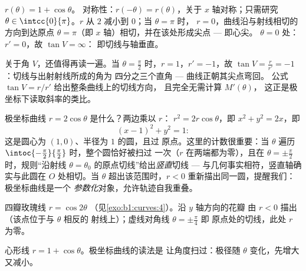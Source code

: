 \begin{example}[心形线]\label{ex:b1:curves:cardioid}
$r(\theta) = 1 + \cos\theta$。 对称性：$r(-\theta)
= r(\theta)$，关于 $x$ 轴对称；只需研究 $\theta \in
\intcc{0}{\pi}$。$r$ 从 $2$ 减小到 $0$；当 $\theta = \pi$ 时，
$r = 0$，曲线沿与射线相切的方向到达原点
$\theta = \pi$（即 $x$ 轴）相切，并在该处形成尖点 --- 即心尖。
$\theta = 0$ 处：$r' = 0$，故 $\tan V = \infty$：
即切线与轴垂直。

关于角 $V$，还值得再读一遍。当 $\theta =
\frac\pi2$ 时，$r = 1$，$r' = -1$，故 $\tan V = \frac{r}{r'} =
-1$：切线与出射射线所成的角为
四分之三个直角 --- 曲线正朝其尖点弯回。
公式 $\tan V = r/r'$ 给出整条曲线上的切线方向，
且完全无需计算 $M'(\theta)$，
这正是极坐标下读取斜率的类比。
\end{example}

\begin{example}
\label{ex:b1:curves:polarcircle}
极坐标曲线 $r = 2\cos\theta$ 是什么？两边乘以 $r$：
$r^2 = 2r\cos\theta$，即 $x^2 + y^2 = 2x$，即
\[
(x - 1)^2 + y^2 = 1 :
\]
这是圆心为 $(1, 0)$、半径为 $1$ 的圆，且过
原点。这里的计数很重要：当 $\theta$ 遍历
$\intoc{-\frac\pi2}{\frac\pi2}$ 时，整个圆恰好被扫过
一次（$r$ 在两端都为零），且在 $\theta =
\pm\frac\pi2$ 时，规则“沿射线
$\theta = \theta_0$ 的原点切线”给出\emph{竖直}切线 ---
与几何事实相符，竖直轴确实与此圆在
$O$ 处相切。当 $\theta$ 超出该范围时，$r < 0$
重新描出同一圆，提醒我们：极坐标曲线是一个
\emph{参数化}对象，允许轨迹自我重叠。
\end{example}

\begin{omfigure}

{\small 四瓣玫瑰线 $r = \cos 2\theta$
（见\cref{exo:b1:curves:4}）。沿 $y$ 轴方向的花瓣
由 $r < 0$ 描出（该点位于与 $\theta$ 相反的
射线上）；虚线对角线 $\theta = \pm\frac\pi4$ 即
原点处的切线，此处 $r$ 为零。}
\end{omfigure}

\begin{omfigure}

{\small 心形线 $r = 1 + \cos\theta$。极坐标曲线的读法是
让角度扫过：极径随 $\theta$
变化，先增大又减小。}
\end{omfigure}

